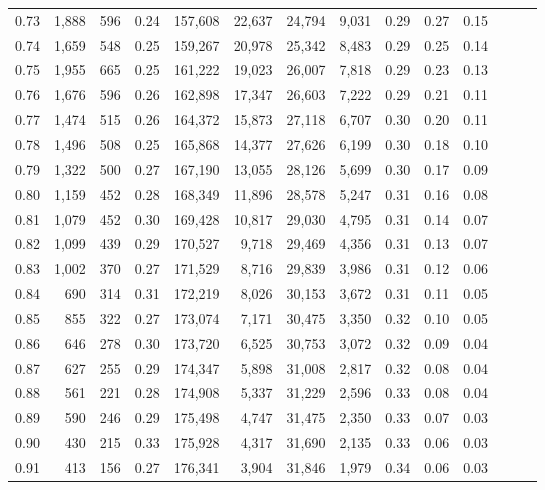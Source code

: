 \begin{tabular}{rrrrrrrrrrrrrr}
0.73 &  1,888 &  596 &  0.24 &  157,608 &   22,637 &  24,794 &   9,031 &  0.29 &  0.27 &      0.15 \\
0.74 &  1,659 &  548 &  0.25 &  159,267 &   20,978 &  25,342 &   8,483 &  0.29 &  0.25 &      0.14 \\
0.75 &  1,955 &  665 &  0.25 &  161,222 &   19,023 &  26,007 &   7,818 &  0.29 &  0.23 &      0.13 \\
0.76 &  1,676 &  596 &  0.26 &  162,898 &   17,347 &  26,603 &   7,222 &  0.29 &  0.21 &      0.11 \\
0.77 &  1,474 &  515 &  0.26 &  164,372 &   15,873 &  27,118 &   6,707 &  0.30 &  0.20 &      0.11 \\
0.78 &  1,496 &  508 &  0.25 &  165,868 &   14,377 &  27,626 &   6,199 &  0.30 &  0.18 &      0.10 \\
0.79 &  1,322 &  500 &  0.27 &  167,190 &   13,055 &  28,126 &   5,699 &  0.30 &  0.17 &      0.09 \\
0.80 &  1,159 &  452 &  0.28 &  168,349 &   11,896 &  28,578 &   5,247 &  0.31 &  0.16 &      0.08 \\
0.81 &  1,079 &  452 &  0.30 &  169,428 &   10,817 &  29,030 &   4,795 &  0.31 &  0.14 &      0.07 \\
0.82 &  1,099 &  439 &  0.29 &  170,527 &    9,718 &  29,469 &   4,356 &  0.31 &  0.13 &      0.07 \\
0.83 &  1,002 &  370 &  0.27 &  171,529 &    8,716 &  29,839 &   3,986 &  0.31 &  0.12 &      0.06 \\
0.84 &    690 &  314 &  0.31 &  172,219 &    8,026 &  30,153 &   3,672 &  0.31 &  0.11 &      0.05 \\
0.85 &    855 &  322 &  0.27 &  173,074 &    7,171 &  30,475 &   3,350 &  0.32 &  0.10 &      0.05 \\
0.86 &    646 &  278 &  0.30 &  173,720 &    6,525 &  30,753 &   3,072 &  0.32 &  0.09 &      0.04 \\
0.87 &    627 &  255 &  0.29 &  174,347 &    5,898 &  31,008 &   2,817 &  0.32 &  0.08 &      0.04 \\
0.88 &    561 &  221 &  0.28 &  174,908 &    5,337 &  31,229 &   2,596 &  0.33 &  0.08 &      0.04 \\
0.89 &    590 &  246 &  0.29 &  175,498 &    4,747 &  31,475 &   2,350 &  0.33 &  0.07 &      0.03 \\
0.90 &    430 &  215 &  0.33 &  175,928 &    4,317 &  31,690 &   2,135 &  0.33 &  0.06 &      0.03 \\
0.91 &    413 &  156 &  0.27 &  176,341 &    3,904 &  31,846 &   1,979 &  0.34 &  0.06 &      0.03 \\

\end{tabular}
